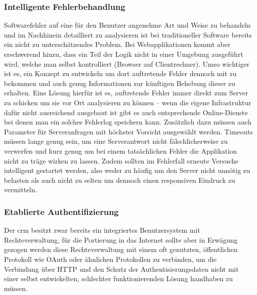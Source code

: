 \subsubsection{Intelligente Fehlerbehandlung}
Softwarefehler auf eine für den Benutzer angenehme Art und Weise zu behandeln und im Nachhinein detailliert zu analysieren ist bei traditioneller Software bereits ein nicht zu unterschätzendes Problem. Bei Webapplikationen kommt aber erschwerend hinzu, dass ein Teil der Logik nicht in einer Umgebung ausgeführt wird, welche man selbst kontrolliert (Browser auf Clientrechner). Umso wichtiger ist es, ein Konzept zu entwickeln um dort auftretende Fehler dennoch mit zu bekommen und auch genug Informationen zur künftigen Behebung dieser zu erhalten. Eine Lösung hierfür ist es, auftretende Fehler immer direkt zum Server zu schicken um sie vor Ort analysieren zu können -- wenn die eigene Infrastruktur dafür nicht ausreichend ausgebaut ist gibt es auch entsprechende Online-Dienste bei denen man ein solches Fehlerlog speichern kann. Zusätzlich dazu müssen auch Parameter für Serveranfragen mit höchster Vorsicht ausgewählt werden. Timeouts müssen lange genug sein, um eine Serverantwort nicht fälschlicherweise zu verwerfen und kurz genug um bei einem tatsächlichen Fehler die Applikation nicht zu träge wirken zu lassen. Zudem sollten im Fehlerfall erneute Versuche intelligent gestartet werden, also weder zu häufig um den Server nicht unnötig zu belasten als auch nicht zu selten um dennoch einen responsiven Eindruck zu vermitteln.

\subsubsection{Etablierte Authentifizierung}
Der \gls{crm} besitzt zwar bereits ein integriertes Benutzersystem mit Rechteverwaltung, für die Portierung in das Internet sollte aber in Erwägung gezogen werden diese Rechteverwaltung mit einem oft genutzten, öffentlichen Protokoll wie OAuth oder ähnlichen Protokollen zu verbinden, um die Verbindung über HTTP und den Schutz der Authentisierungsdaten nicht mit einer selbst entwickelten, schlechter funktionierenden Lösung handhaben zu müssen.

